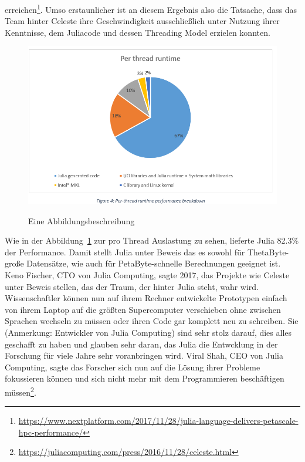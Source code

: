 \documentclass[proseminar,german,utf8]{zihpub}
\begin{document}
erreichen\footnote{\url{https://www.nextplatform.com/2017/11/28/julia-language-delivers-petascale-hpc-performance/}}. Umso erstaunlicher ist an diesem Ergebnis also die Tatsache, dass das Team hinter Celeste ihre Geschwindigkeit ausschließlich unter Nutzung ihrer Kenntnisse, dem Juliacode und dessen Threading Model erzielen konnten.

\begin{figure}[hbt!]
  \centering
  \caption{Eine Abbildungsbeschreibung}
  \includegraphics[scale=0.5]{celestejulia.png}
  \label{fig:celestejulia}
\end{figure}

Wie in der Abbildung~\ref{fig:celestejulia} zur pro Thread Auslastung zu sehen, lieferte Julia 82.3\% der Performance. Damit stellt Julia unter Beweis das es sowohl für ThetaByte-große Datensätze, wie auch für PetaByte-schnelle Berechnungen geeignet ist. Keno Fischer, CTO von Julia Computing, sagte 2017, das Projekte wie Celeste unter Beweis stellen, das der Traum, der hinter Julia steht, wahr wird. Wissenschaftler können nun auf ihrem Rechner entwickelte Prototypen einfach von ihrem Laptop auf die größten Supercomputer verschieben ohne zwischen Sprachen wechseln zu müssen oder ihren Code gar komplett neu zu schreiben. Sie (Anmerkung: Entwickler von Julia Computing) sind sehr stolz darauf, dies alles geschafft zu haben und glauben sehr daran, das Julia die Entwcklung in der Forschung für viele Jahre sehr voranbringen wird. Viral Shah, CEO von Julia Computing, sagte das Forscher sich nun auf die Lösung ihrer Probleme fokussieren können und sich nicht mehr mit dem Programmieren beschäftigen müssen\footnote{\url{https://juliacomputing.com/press/2016/11/28/celeste.html}}.
\end{document}
